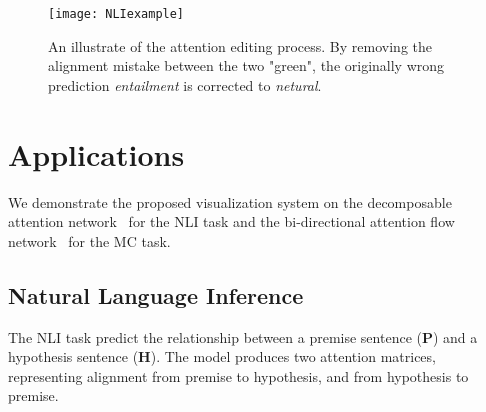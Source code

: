 \begin{figure*}[t]
\centering
\vspace{-2mm}
 \texttt{[image: NLIexample]}
  \vspace{-6mm}
 \caption{
An illustrate of the attention editing process. 
By removing the alignment mistake between the two "green", the originally wrong prediction \emph{entailment} is corrected to \emph{netural}.
}
  \vspace{-3mm}
\label{fig:NLIexample}
\end{figure*}

\section{Applications}
We demonstrate the proposed visualization system on the decomposable attention network~\cite{parikh2016emnlp}
for the NLI task and the bi-directional attention flow network~\cite{Seo2016} for the MC task.

\subsection{Natural Language Inference}
\label{sec:NLIexample}
The NLI task predict the relationship between a premise sentence (\textbf{P}) and a hypothesis sentence (\textbf{H}).
The model produces two attention matrices, representing alignment from premise to hypothesis, and from hypothesis to premise.

